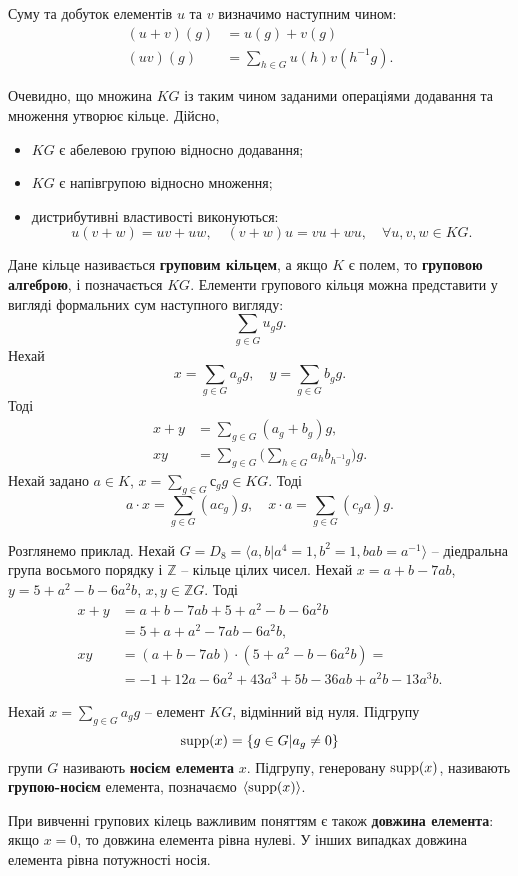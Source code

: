 Суму та добуток елементів $u$ та $v$ визначимо наступним чином:
\[
\begin{split}
(u+v)(g) &= u(g) + v(g)\\
(uv)(g) &= \sum_{h \in G} u(h) v(h^{-1} g).
\end{split}
\]

Очевидно, що множина $KG$ із таким чином заданими операціями додавання та множення утворює кільце. Дійсно,
\begin{itemize}[noitemsep,partopsep=0pt,topsep=0pt,parsep=0pt]
\item $KG$ є абелевою групою відносно додавання;
\item $KG$ є напівгрупою відносно множення;
\item дистрибутивні властивості виконуються:
\[
u(v+w) = uv+uw, \quad (v+w)u=vu+wu, \quad \forall u,v,w \in KG.
\]
\end{itemize}

Дане кільце називається \textbf{груповим кільцем}, а якщо $K$ є полем, то \textbf{груповою алгеброю}, і позначається $KG$. Елементи групового кільця можна представити у вигляді формальних сум наступного вигляду:
\[
\sum_{g \in G} u_g g.
\]
Нехай
\[
x = \sum_{g \in G} a_g g, \quad y = \sum_{g \in G} b_g g.
\]
Тоді
\[
\begin{split}
x + y &= \sum_{g \in G} (a_g + b_g) g, \\
xy &= \sum_{g \in G} \Big( \sum_{h \in G} a_h b_{h^{-1}g}\Big)g.
\end{split}
\]
Нехай задано $a \in K$, $x = \sum_{g \in G} с_g g \in KG$. Тоді
\[
a \cdot x = \sum_{g \in G} (a c_g)g, \quad x \cdot a = \sum_{g \in G} (c_g a)g.
\]


Розглянемо приклад. Нехай $G=D_8 = \langle a,b| a^4 = 1, b^2 = 1, bab = a^{-1} \rangle$ -- діедральна група восьмого порядку і $\mathbb{Z}$ -- кільце цілих чисел. Нехай $x = a+b-7ab$, $y=5+a^2-b-6a^2 b$, $x,y \in \mathbb{Z}G$. Тоді
\[
\begin{split}
x+y  & = a+b-7ab + 5+a^2-b-6a^2 b \\
     & = 5+a+a^2-7ab-6a^2b, \\
xy &= (a+b-7ab) \cdot (5+a^2-b-6a^2 b) = \\
& = -1+12a -6a^2 + 43a^3+5b-36ab+a^2b-13a^3b.
\end{split}
\]


Нехай $x = \sum_{g \in G} a_g g$ -- елемент $KG$, відмінний від нуля. Підгрупу
\[
\operatorname{supp}(x) = \{ g \in G | a_g \neq 0 \}
\]
групи $G$ називають \textbf{носієм елемента} $x$. Підгрупу, генеровану $\operatorname{supp}(x)$, називають \textbf{групою-носієм} елемента, позначаємо $\langle \operatorname{supp}(x) \rangle$.

При вивченні групових кілець важливим поняттям є також \textbf{довжина елемента}: якщо $x=0$, то довжина елемента рівна нулеві. У інших випадках довжина елемента рівна потужності носія.  

